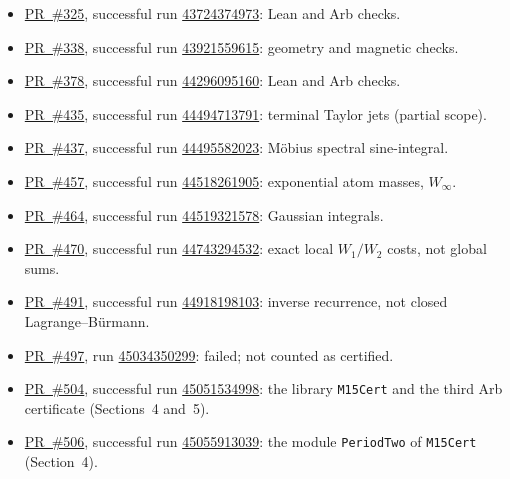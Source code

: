 \documentclass[11pt,a4paper]{article}
\newcommand{\R}{https://github.com/ralfanop/Certifications_Eulerian_polar-curve_computations}
\begin{document}
\begin{itemize}\setlength{\itemsep}{1pt}\raggedright

\item \href{\R/pull/325}{PR~\#325}, successful run \href{\R/actions/runs/43724374973}{43724374973}: Lean and Arb checks.
\item \href{\R/pull/338}{PR~\#338}, successful run \href{\R/actions/runs/43921559615}{43921559615}: geometry and magnetic checks.
\item \href{\R/pull/378}{PR~\#378}, successful run \href{\R/actions/runs/44296095160}{44296095160}: Lean and Arb checks.
\item \href{\R/pull/435}{PR~\#435}, successful run \href{\R/actions/runs/44494713791}{44494713791}: terminal Taylor jets (partial scope).
\item \href{\R/pull/437}{PR~\#437}, successful run \href{\R/actions/runs/44495582023}{44495582023}: Möbius spectral sine-integral.
\item \href{\R/pull/457}{PR~\#457}, successful run \href{\R/actions/runs/44518261905}{44518261905}: exponential atom masses, $W_\infty$.
\item \href{\R/pull/464}{PR~\#464}, successful run \href{\R/actions/runs/44519321578}{44519321578}: Gaussian integrals.
\item \href{\R/pull/470}{PR~\#470}, successful run \href{\R/actions/runs/44743294532}{44743294532}: exact local $W_1/W_2$ costs, not global sums.
\item \href{\R/pull/491}{PR~\#491}, successful run \href{\R/actions/runs/44918198103}{44918198103}: inverse recurrence, not closed Lagrange--B\"urmann.
\item \href{\R/pull/497}{PR~\#497}, run \href{\R/actions/runs/45034350299}{45034350299}: failed; not counted as certified.
\item \href{\R/pull/504}{PR~\#504}, successful run \href{\R/actions/runs/45051534998}{45051534998}: the library \texttt{M15Cert} and the third Arb certificate (Sections~4 and~5).
\item \href{\R/pull/506}{PR~\#506}, successful run \href{\R/actions/runs/45055913039}{45055913039}: the module \texttt{PeriodTwo} of \texttt{M15Cert} (Section~4).
\end{itemize}
\end{document}
